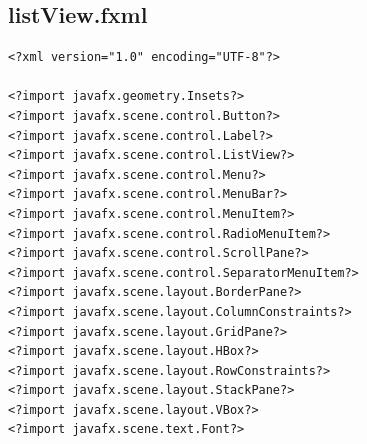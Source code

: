 \subsection{listView.fxml}
\begin{lstlisting}
<?xml version="1.0" encoding="UTF-8"?>

<?import javafx.geometry.Insets?>
<?import javafx.scene.control.Button?>
<?import javafx.scene.control.Label?>
<?import javafx.scene.control.ListView?>
<?import javafx.scene.control.Menu?>
<?import javafx.scene.control.MenuBar?>
<?import javafx.scene.control.MenuItem?>
<?import javafx.scene.control.RadioMenuItem?>
<?import javafx.scene.control.ScrollPane?>
<?import javafx.scene.control.SeparatorMenuItem?>
<?import javafx.scene.layout.BorderPane?>
<?import javafx.scene.layout.ColumnConstraints?>
<?import javafx.scene.layout.GridPane?>
<?import javafx.scene.layout.HBox?>
<?import javafx.scene.layout.RowConstraints?>
<?import javafx.scene.layout.StackPane?>
<?import javafx.scene.layout.VBox?>
<?import javafx.scene.text.Font?>


\end{lstlisting}
